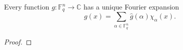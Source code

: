 \begin{theorem}
\label{lem:ff-fourier-expansion}
\leanok
Every function $g : \mathbb{F}_q^n \to \mathbb{C}$ has a unique
  Fourier expansion
  \[
    g(x) = \sum_{\alpha \in \mathbb{F}_q^n} \widehat g(\alpha)\chi_\alpha(x).
  \]
\end{theorem}
\begin{proof}
\end{proof}
